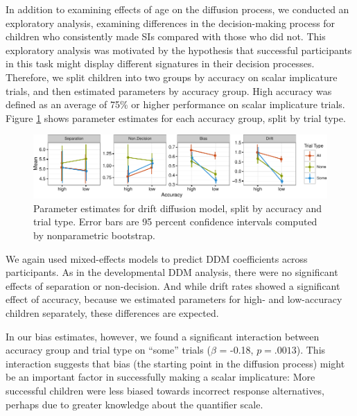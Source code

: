 \documentclass[10pt, letterpaper]{article}
\newenvironment{CodeChunk}{}{}
\begin{document}
In addition to examining effects of age on the diffusion process, we
conducted an exploratory analysis, examining differences in the
decision-making process for children who consistently made SIs compared
with those who did not. This exploratory analysis was motivated by the
hypothesis that successful participants in this task might display
different signatures in their decision processes. Therefore, we split
children into two groups by accuracy on scalar implicature trials, and
then estimated parameters by accuracy group. High accuracy was defined
as an average of 75\% or higher performance on scalar implicature
trials. Figure \ref{fig:param_plot} shows parameter estimates for each
accuracy group, split by trial type.

\begin{CodeChunk}
\begin{figure}[!tb]

{\centering \includegraphics{figs/param_plot-1} 

}

\caption[Parameter estimates for drift diffusion model, split by accuracy and trial type]{Parameter estimates for drift diffusion model, split by accuracy and trial type. Error bars are 95 percent confidence intervals computed by nonparametric bootstrap.}\label{fig:param_plot}
\end{figure}
\end{CodeChunk}

We again used mixed-effects models to predict DDM coefficients across
participants. As in the developmental DDM analysis, there were no
significant effects of separation or non-decision. And while drift rates
showed a significant effect of accuracy, because we estimated parameters
for high- and low-accuracy children separately, these differences are
expected.

In our bias estimates, however, we found a significant interaction
between accuracy group and trial type on ``some'' trials (\(\beta\) =
-0.18, \(p = .0013\)). This interaction suggests that bias (the starting
point in the diffusion process) might be an important factor in
successfully making a scalar implicature: More successful children were
less biased towards incorrect response alternatives, perhaps due to
greater knowledge about the quantifier scale.
\end{document}
